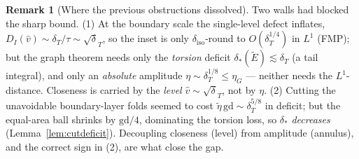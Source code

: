 \documentclass[11pt]{article}
\theoremstyle{definition}
\newtheorem{remark}[theorem]{Remark}
\newcommand{\dT}{\delta_T}
\newcommand{\diso}{\delta_{\mathrm{iso}}}
\newcommand{\gd}{\mathrm{gd}}
\newcommand{\Etil}{\widetilde E}
\newcommand{\dstar}{\delta_{*}}
\begin{document}
\begin{remark}[Where the previous obstructions dissolved]
Two walls had blocked the sharp bound. (1) At the boundary scale the
single-level defect inflates, $D_I(\hat v)\sim\dT/\tau\sim\sqrt\dT$, so the
inset is only $\diso$-round to $O(\dT^{1/4})$ in $L^1$ (FMP); but the
graph theorem needs only the \emph{torsion} deficit $\dstar(\Etil)\lesssim
\dT$ (a tail integral), and only an \emph{absolute} amplitude
$\eta\sim\dT^{1/8}\le\eta_G$ — neither needs the $L^1$-distance. Closeness is
carried by the \emph{level} $\hat v\sim\sqrt\dT$, not by $\eta$. (2) Cutting
the unavoidable boundary-layer folds seemed to cost
$\tilde\eta\,\gd\sim\dT^{5/8}$ in deficit; but the equal-area ball shrinks by
$\gd/4$, dominating the torsion loss, so $\dstar$ \emph{decreases}
(Lemma~\ref{lem:cutdeficit}). Decoupling closeness (level) from amplitude
(annulus), and the correct sign in (2), are what close the gap.
\end{remark}
\end{document}
